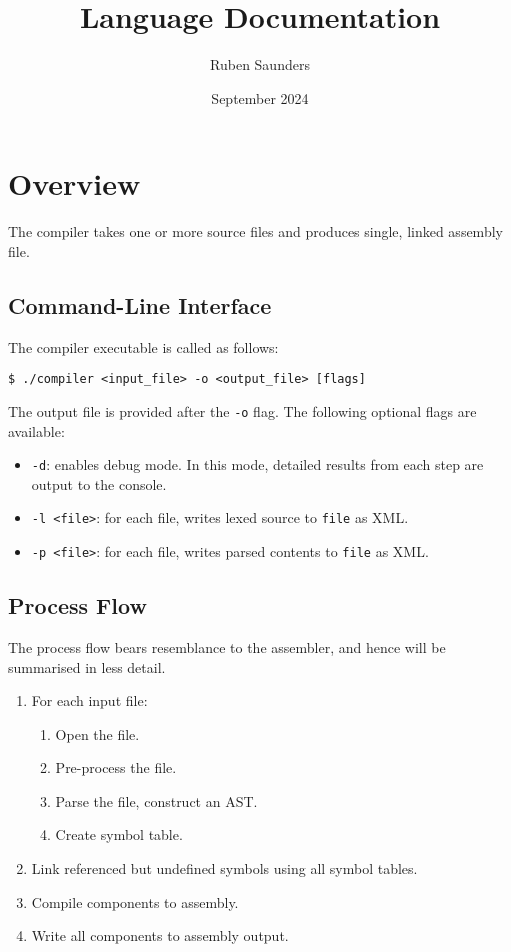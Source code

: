 \documentclass{article}
\title{Language Documentation}
\author{Ruben Saunders}
\date{September 2024}
\begin{document}
\maketitle
\tableofcontents

\newpage

\section{Overview}

The compiler takes one or more source files and produces single, linked assembly file.

\subsection{Command-Line Interface}

The compiler executable is called as follows:

\medskip
\begin{lstlisting}[style=bashconsole]
$ ./compiler <input_file> -o <output_file> [flags]
\end{lstlisting}

The output file is provided after the \texttt{-o} flag.
The following optional flags are available:
\begin{itemize}
    \item \texttt{-d}: enables debug mode.
    In this mode, detailed results from each step are output to the console.
    \item \texttt{-l <file>}: for each file, writes lexed source to \texttt{file} as XML.
    \item \texttt{-p <file>}: for each file, writes parsed contents to \texttt{file} as XML.
\end{itemize}

\subsection{Process Flow}

The process flow bears resemblance to the assembler, and hence will be summarised in less detail.

\begin{enumerate}
    \item For each input file:
    \begin{enumerate}
        \item Open the file.
        \item Pre-process the file.
        \item Parse the file, construct an AST.
        \item Create symbol table.
    \end{enumerate}
    \item Link referenced but undefined symbols using all symbol tables.
    \item Compile components to assembly.
    \item Write all components to assembly output.
\end{enumerate}
\end{document}
